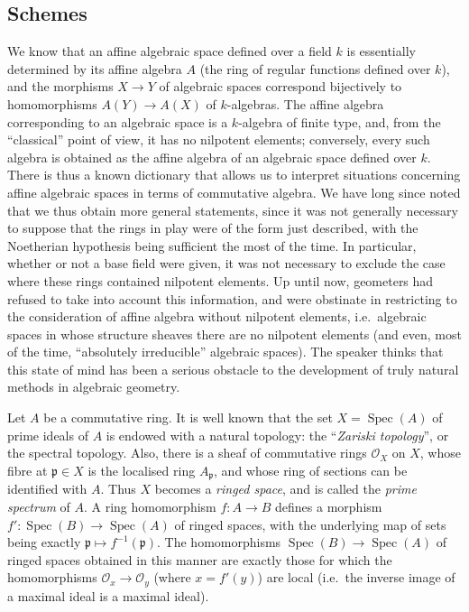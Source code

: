 \documentclass{article}
\newcommand{\oldpage}[1]{\marginpar{\footnotesize$\Big\vert$ \textit{p.~#1}}}
\theoremstyle{definition}
\theoremstyle{definition}
\theoremstyle{definition}
\theoremstyle{definition}
\theoremstyle{remark}
\begin{document}
\hypertarget{fga-2-section-1}{%
\subsection{Schemes}\label{fga-2-section-1}}

\oldpage{182-01}We know that an affine algebraic space defined over a field \(k\) is essentially determined by its affine algebra \(A\) (the ring of regular functions defined over \(k\)), and the morphisms \(X\to Y\) of algebraic spaces correspond bijectively to homomorphisms \(A(Y)\to A(X)\) of \(k\)-algebras.
The affine algebra corresponding to an algebraic space is a \(k\)-algebra of finite type, and, from the ``classical'' point of view, it has no nilpotent elements;
conversely, every such algebra is obtained as the affine algebra of an algebraic space defined over \(k\).
There is thus a known dictionary that allows us to interpret situations concerning affine algebraic spaces in terms of commutative algebra.
We have long since noted that we thus obtain more general statements, since it was not generally necessary to suppose that the rings in play were of the form just described, with the Noetherian hypothesis being sufficient the most of the time.
In particular, whether or not a base field were given, it was not necessary to exclude the case where these rings contained nilpotent elements.
Up until now, geometers had refused to take into account this information, and were obstinate in restricting to the consideration of affine algebra without nilpotent elements, i.e.~algebraic spaces in whose structure sheaves there are no nilpotent elements (and even, most of the time, ``absolutely irreducible'' algebraic spaces).
The speaker thinks that this state of mind has been a serious obstacle to the development of truly natural methods in algebraic geometry.

Let \(A\) be a commutative ring.
It is well known that the set \(X=\operatorname{Spec}(A)\) of prime ideals of \(A\) is endowed with a natural topology: the ``\emph{Zariski topology}'', or the spectral topology.
Also, there is a sheaf of commutative rings \({\mathscr{O}}_X\) on \(X\), whose fibre at \({\mathfrak{p}}\in X\) is the localised ring \(A_{\mathfrak{p}}\), and whose ring of sections can be identified with \(A\).
Thus \(X\) becomes a \emph{ringed space}, and is called the \emph{prime spectrum} of \(A\).
A ring homomorphism \(f\colon A\to B\) defines a morphism \(f'\colon\operatorname{Spec}(B)\to\operatorname{Spec}(A)\) of ringed spaces, with the underlying map of sets being exactly \({\mathfrak{p}}\mapsto f^{-1}({\mathfrak{p}})\).
The homomorphisms \(\operatorname{Spec}(B)\to\operatorname{Spec}(A)\) of ringed spaces obtained in this manner are exactly those for which the homomorphisms \({\mathscr{O}}_x\to{\mathscr{O}}_y\) (where \(x=f'(y)\)) are local (i.e.~the inverse image of a maximal ideal is a maximal ideal).
\end{document}
